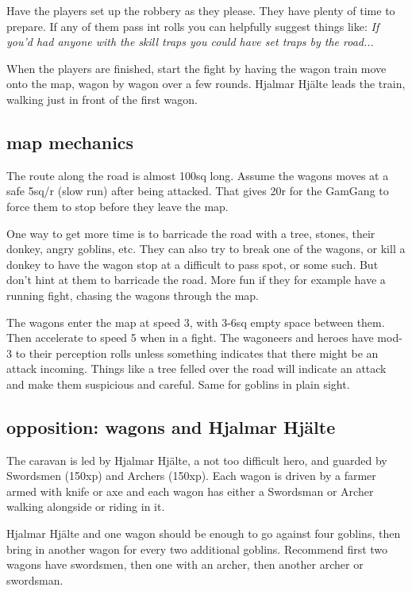 Have the players set up the robbery as they please. They have plenty of time to prepare. If any of them pass int rolls you can helpfully suggest things like: \emph{If you'd had anyone with the skill traps you could have set traps by the road...}

When the players are finished, start the fight by having the wagon train move onto the map, wagon by wagon over a few rounds. Hjalmar Hjälte leads the train, walking just in front of the first wagon.


\subsection*{map mechanics}

The route along the road is almost 100sq long. Assume the wagons moves at a safe 5sq/r (slow run) after being attacked. That gives 20r for the GamGang to force them to stop before they leave the map.

One way to get more time is to barricade the road with a tree, stones, their donkey, angry goblins, etc. They can also try to break one of the wagons, or kill a donkey to have the wagon stop at a difficult to pass spot, or some such. But don't hint at them to barricade the road. More fun if they for example have a running fight, chasing the wagons through the map.

The wagons enter the map at speed 3, with 3-6sq empty space between them. Then accelerate to speed 5 when in a fight. The wagoneers and heroes have mod-3 to their perception rolls unless something indicates that there might be an attack incoming. Things like a tree felled over the road will indicate an attack and make them suspicious and careful. Same for goblins in plain sight.


\subsection*{opposition: wagons and Hjalmar Hjälte}

The caravan is led by Hjalmar Hjälte, a not too difficult hero, and guarded by Swordsmen (150xp) and Archers (150xp). Each wagon is driven by a farmer armed with knife or axe and each wagon has either a Swordsman or Archer walking alongside or riding in it.

Hjalmar Hjälte and one wagon should be enough to go against four goblins, then bring in another wagon for every two additional goblins. Recommend first two wagons have swordsmen, then one with an archer, then another archer or swordsman.

